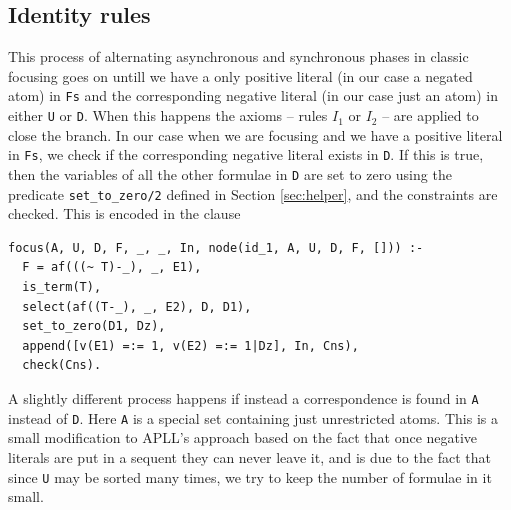 \documentclass[a4paper, 12pt, tesi, english]{report}
\begin{document}
\subsection{Identity rules}
This process of alternating asynchronous and synchronous phases in classic focusing goes on untill we have a only positive literal (in our case a negated atom) in \texttt{Fs} and the corresponding negative literal (in our case just an atom) in either \texttt{U} or \texttt{D}.
When this happens the axioms -- rules $I_1$ or $I_2$ -- are applied to close the branch.
In our case when we are focusing and we have a positive literal in \texttt{Fs}, we check if the corresponding negative literal exists in \texttt{D}.
If this is true, then the variables of all the other formulae in \texttt{D} are set to zero using the predicate \texttt{set\_to\_zero/2} defined in Section \ref{sec:helper}, and the constraints are checked.
This is encoded in the clause 
\begin{verbatim}
focus(A, U, D, F, _, _, In, node(id_1, A, U, D, F, [])) :-
  F = af(((~ T)-_), _, E1),
  is_term(T),
  select(af((T-_), _, E2), D, D1),
  set_to_zero(D1, Dz),
  append([v(E1) =:= 1, v(E2) =:= 1|Dz], In, Cns),
  check(Cns).
\end{verbatim}
A slightly different process happens if instead a correspondence is found in \texttt{A} instead of \texttt{D}.
Here \texttt{A} is a special set containing just unrestricted atoms.
This is a small modification to APLL's approach based on the fact that once negative literals are put in a sequent they can never leave it, and is due to the fact that since \texttt{U} may be sorted many times, we try to keep the number of formulae in it small.
\end{document}
